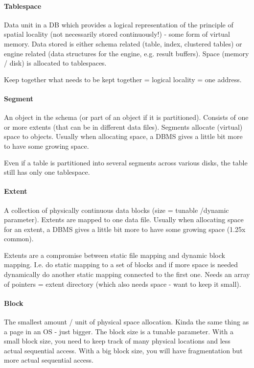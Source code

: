 
\paragraph{Tablespace}
Data unit in a DB which provides a logical representation of the principle of spatial locality (not necessarily stored continuously!) - some form of virtual memory. Data stored is either schema related (table, index, clustered tables) or engine related (data structures for the engine, e.g. result buffers). Space (memory / disk) is allocated to tablespaces.

Keep together what needs to be kept together = logical locality = one address.

\paragraph{Segment}
An object in the schema (or part of an object if it is partitioned). Consists of one or more extents (that can be in different data files). Segments allocate (virtual) space to objects. Usually when allocating space, a DBMS gives a little bit more to have some growing space.

Even if a table is partitioned into several segments across various disks, the table still has only one tablespace.

\paragraph{Extent}
A collection of physically continuous data blocks (size = tunable /dynamic parameter). Extents are mapped to one data file. Usually when allocating space for an extent, a DBMS gives a little bit more to have some growing space (1.25x common).

Extents are a compromise between static file mapping and dynamic block mapping. I.e. do static mapping to a set of blocks and if more space is needed dynamically do another static mapping connected to the first one. Needs an array of pointers = extent directory (which also needs space - want to keep it small).

\paragraph{Block}
The smallest amount / unit of physical space allocation. Kinda the same thing as a page in an OS - just bigger. The block size is a tunable parameter. With a small block size, you need to keep track of many physical locations and less actual sequential access. With a big block size, you will have fragmentation but more actual sequential access.

